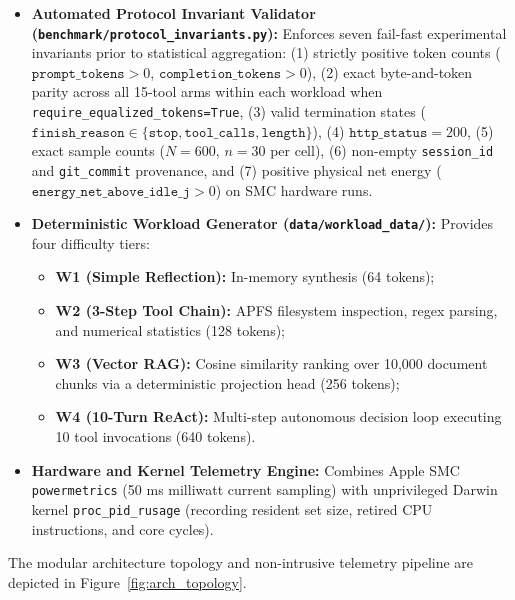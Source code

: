 \documentclass[preprint,12pt,3p]{elsarticle}
\begin{document}
\begin{itemize}
\begin{itemize}
        \item \texttt{LocalLLMBaselineAdapter} (\texttt{local\_llm\_baseline} / alias \texttt{neural\_baseline}): Direct HTTP streaming pass-through measuring zero-orchestrator neural inference latency.
    \end{itemize}
    \item \textbf{Automated Protocol Invariant Validator (\texttt{benchmark/protocol\_invariants.py}):} Enforces seven fail-fast experimental invariants prior to statistical aggregation: (1) strictly positive token counts ($\texttt{prompt\_tokens} > 0$, $\texttt{completion\_tokens} > 0$), (2) exact byte-and-token parity across all 15-tool arms within each workload when \texttt{require\_equalized\_tokens=True}, (3) valid termination states ($\texttt{finish\_reason} \in \{\texttt{stop}, \texttt{tool\_calls}, \texttt{length}\}$), (4) $\texttt{http\_status} = 200$, (5) exact sample counts ($N=600$, $n=30$ per cell), (6) non-empty \texttt{session\_id} and \texttt{git\_commit} provenance, and (7) positive physical net energy ($\texttt{energy\_net\_above\_idle\_j} > 0$) on SMC hardware runs.
    \item \textbf{Deterministic Workload Generator (\texttt{data/workload\_data/}):} Provides four difficulty tiers:
    \begin{itemize}
        \item \textbf{W1 (Simple Reflection):} In-memory synthesis (64 tokens);
        \item \textbf{W2 (3-Step Tool Chain):} APFS filesystem inspection, regex parsing, and numerical statistics (128 tokens);
        \item \textbf{W3 (Vector RAG):} Cosine similarity ranking over 10,000 document chunks via a deterministic projection head (256 tokens);
        \item \textbf{W4 (10-Turn ReAct):} Multi-step autonomous decision loop executing 10 tool invocations (640 tokens).
    \end{itemize}
    \item \textbf{Hardware and Kernel Telemetry Engine:} Combines Apple SMC \texttt{powermetrics} (50 ms milliwatt current sampling) with unprivileged Darwin kernel \texttt{proc\_pid\_rusage} (recording resident set size, retired CPU instructions, and core cycles).
\end{itemize}

The modular architecture topology and non-intrusive telemetry pipeline are depicted in Figure~\ref{fig:arch_topology}.
\end{document}
